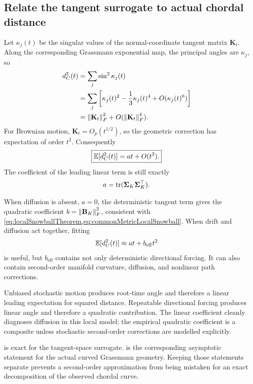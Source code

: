 \subsection{Relate the tangent surrogate to actual chordal distance}

Let \(\kappa_j(t)\) be the singular values of the normal-coordinate tangent matrix \(\mathbf K_t\). Along the corresponding Grassmann exponential map, the principal angles are \(\kappa_j\), so
\begin{align}
d_C^2(t)
&=\sum_j\sin^2\kappa_j(t)\\
&=\sum_j\left[\kappa_j(t)^2-\frac13\kappa_j(t)^4
+O(\kappa_j(t)^6)\right]\\
&=\left\lVert \mathbf K_t\right\rVert_F^2+O(\left\lVert \mathbf K_t\right\rVert_F^4).
\label{eq:stochasticChordalExpansion}
\end{align}
For Brownian motion, \(\mathbf K_t=O_p(t^{1/2})\), so the geometric correction has expectation of order \(t^2\). Consequently
\begin{equation}
\boxed{
\mathbb E[d_C^2(t)]=a t+O(t^2).}
\label{eq:stochasticLeadingLaw}
\end{equation}
The coefficient of the leading linear term is still exactly
\begin{equation}
a=\operatorname{tr}(\boldsymbol\Sigma_K\boldsymbol\Sigma_K^\top).
\end{equation}

When diffusion is absent, \(a=0\), the deterministic tangent term gives the quadratic coefficient \(b=\left\lVert \mathbf B_K\right\rVert_F^2\), consistent with \cref{eq:localSnowballTheorem,eq:commonMetricLocalSnowball}. When drift and diffusion act together, fitting
\begin{equation}
\mathbb E[d_C^2(t)]\approx a t+b_{\mathrm{eff}}t^2
\end{equation}
is useful, but \(b_{\mathrm{eff}}\) contains not only deterministic directional forcing. It can also contain second-order manifold curvature, diffusion, and nonlinear path corrections.

\inwords Unbiased stochastic motion produces root-time angle and therefore a linear leading expectation for squared distance. Repeatable directional forcing produces linear angle and therefore a quadratic contribution. The linear coefficient cleanly diagnoses diffusion in this local model; the empirical quadratic coefficient is a composite unless stochastic second-order corrections are modelled explicitly.

\begin{mathteach}
 is exact for the tangent-space surrogate.  is the corresponding asymptotic statement for the actual curved Grassmann geometry. Keeping those statements separate prevents a second-order approximation from being mistaken for an exact decomposition of the observed chordal curve.
\end{mathteach}

